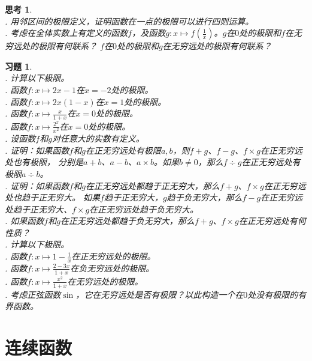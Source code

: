 \documentclass[12pt,UTF8]{ctexbook}
\newtheorem{sk}{思考}[section]
\newtheorem{xt}{习题}[section]
\begin{document}
\begin{sk}
    \mbox{} \\
    . 用邻区间的极限定义，证明函数在一点的极限可以进行四则运算。\\
    . 考虑在全体实数上有定义的函数$f$，及函数$g:x\mapsto f\left(\frac{1}{x}\right)$。$g$在$0$处的极限和$f$在无穷远处的极限有何联系？
    $f$在$0$处的极限和$g$在无穷远处的极限有何联系？
\end{sk}

\begin{xt}
    \mbox{} \\
    . 计算以下极限。\\
    . 函数$f:x\mapsto 2x - 1$在$x = -2$处的极限。\\
    . 函数$f:x\mapsto 2x(1 - x)$在$x = 1$处的极限。\\
    . 函数$f:x\mapsto \frac{x}{1 + x}$在$x = 0$处的极限。\\
    . 函数$f:x\mapsto \frac{2^x}{x^2}$在$x = 0$处的极限。\\
    . 设函数$f$和$g$对任意大的实数有定义。\\
    . 证明：如果函数$f$和$g$在正无穷远处有极限$a, b$，则$f + g$、$f - g$、$f \times g$在正无穷远处也有极限，
    分别是$a + b$、$a - b$、$a \times b$。如果$b\neq 0$，那么$f \div g$在正无穷远处有极限$a \div b$。\\
    . 证明：如果函数$f$和$g$在正无穷远处都趋于正无穷大，那么$f + g$、$f \times g$在正无穷远处也趋于正无穷大。
    如果$f$趋于正无穷大，$g$趋于负无穷大，那么$f - g$在正无穷远处趋于正无穷大、$f \times g$在正无穷远处趋于负无穷大。\\
    . 如果函数$f$和$g$在正无穷远处都趋于负无穷大，那么$f + g$、$f \times g$在正无穷远处有何性质？\\
    . 计算以下极限。\\
    . 函数$f:x\mapsto 1 - \frac{1}{x}$在正无穷远处的极限。\\
    . 函数$f:x\mapsto \frac{2 - 3x}{1 + x}$在负无穷远处的极限。\\
    . 函数$f:x\mapsto \frac{x^2}{1 + x}$在无穷远处的极限。\\
    . 考虑正弦函数$\sin$，它在无穷远处是否有极限？以此构造一个在$0$处没有极限的有界函数。
\end{xt}

\section{连续函数}
\end{document}

